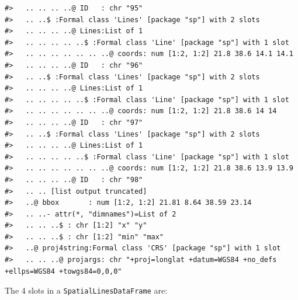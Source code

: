 \documentclass[12pt,a4paper,a4paper]{book}
\theoremstyle{definition}
\theoremstyle{definition}
\theoremstyle{definition}
\theoremstyle{remark}
\begin{document}
\begin{verbatim}
#>   .. .. .. ..@ ID   : chr "95"
#>   .. ..$ :Formal class 'Lines' [package "sp"] with 2 slots
#>   .. .. .. ..@ Lines:List of 1
#>   .. .. .. .. ..$ :Formal class 'Line' [package "sp"] with 1 slot
#>   .. .. .. .. .. .. ..@ coords: num [1:2, 1:2] 21.8 38.6 14.1 14.1
#>   .. .. .. ..@ ID   : chr "96"
#>   .. ..$ :Formal class 'Lines' [package "sp"] with 2 slots
#>   .. .. .. ..@ Lines:List of 1
#>   .. .. .. .. ..$ :Formal class 'Line' [package "sp"] with 1 slot
#>   .. .. .. .. .. .. ..@ coords: num [1:2, 1:2] 21.8 38.6 14 14
#>   .. .. .. ..@ ID   : chr "97"
#>   .. ..$ :Formal class 'Lines' [package "sp"] with 2 slots
#>   .. .. .. ..@ Lines:List of 1
#>   .. .. .. .. ..$ :Formal class 'Line' [package "sp"] with 1 slot
#>   .. .. .. .. .. .. ..@ coords: num [1:2, 1:2] 21.8 38.6 13.9 13.9
#>   .. .. .. ..@ ID   : chr "98"
#>   .. .. [list output truncated]
#>   ..@ bbox       : num [1:2, 1:2] 21.81 8.64 38.59 23.14
#>   .. ..- attr(*, "dimnames")=List of 2
#>   .. .. ..$ : chr [1:2] "x" "y"
#>   .. .. ..$ : chr [1:2] "min" "max"
#>   ..@ proj4string:Formal class 'CRS' [package "sp"] with 1 slot
#>   .. .. ..@ projargs: chr "+proj=longlat +datum=WGS84 +no_defs +ellps=WGS84 +towgs84=0,0,0"
\end{verbatim}

\newpage

The 4 slots in a \texttt{SpatialLinesDataFrame} are:

~
\end{document}
